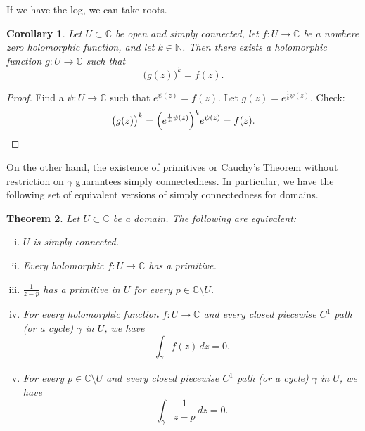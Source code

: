 \documentclass[12pt,openany]{book}
\newcommand{\C}{{\mathbb{C}}}
\newcommand{\N}{{\mathbb{N}}}
\theoremstyle{plain}
\newtheorem{thm}{Theorem}[section]
\newtheorem{cor}[thm]{Corollary}
\theoremstyle{remark}
\theoremstyle{definition}
\theoremstyle{exercise}
\theoremstyle{example}
\begin{document}
If we have the log, we can take roots.

\begin{cor}
Let $U \subset \C$ be open and simply connected,
let $f \colon U \to \C$ be a nowhere zero holomorphic
function, and let $k \in \N$.
Then there exists a holomorphic function $g \colon U \to \C$
such that
\begin{equation*}
{\bigl(g(z)\bigr)}^k = f(z) .
\end{equation*}
\end{cor}

\begin{proof}
Find a $\psi \colon U \to \C$ such that $e^{\psi(z)} = f(z)$.  Let
$g(z) = e^{\frac{1}{k} \psi(z)}$.  Check:
\begin{equation*}
{\bigl(g(z)\bigr)}^k
=
{\left( e^{\frac{1}{k} \psi(z)} \right)}^k
e^{\psi(z)} = f(z) . \qedhere
\end{equation*}
\end{proof}

On the other hand, the existence of primitives or
Cauchy's Theorem without restriction on $\gamma$ guarantees simply
connectedness.  In particular, we have the following set of equivalent
versions of simply connectedness for domains.

\begin{thm}
\pagebreak[2]
Let $U \subset \C$ be a domain.  The following are equivalent:
\begin{enumerate}[(i)]
\item \label{thm:simplyconnected:i}
$U$ is simply connected.
\item \label{thm:simplyconnected:ii}
Every holomorphic $f \colon U \to \C$ has a primitive.
\item \label{thm:simplyconnected:iii}
$\frac{1}{z-p}$ has a primitive in $U$ for every $p \in \C \setminus U$.
\item \label{thm:simplyconnected:iv}
For every holomorphic function $f \colon U \to \C$ and every
closed
piecewise $C^1$ path (or a cycle) $\gamma$ in $U$, we have
\begin{equation*}
\int_\gamma f(z) \, dz = 0 .
\end{equation*}
\item \label{thm:simplyconnected:v}
For every $p \in \C \setminus U$ and every
closed
piecewise $C^1$ path (or a cycle) $\gamma$ in $U$, we have
\begin{equation*}
\int_\gamma \frac{1}{z-p} \, dz = 0 .
\end{equation*}
\end{enumerate}
\end{thm}
\end{document}
